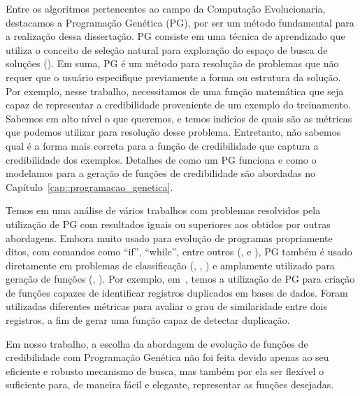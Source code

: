 Entre os algoritmos pertencentes ao campo da Computação Evolucionaria, destacamos a Programação Genética (\textsc{PG}), por ser um método fundamental para a realização dessa dissertação. \textsc{PG} consiste em uma técnica de aprendizado que utiliza o conceito de seleção natural para exploração do espaço de busca de soluções (\cite{Koza92}).
Em suma, \textsc{PG} é um método para resolução de problemas que não requer que o usuário especifique previamente a forma ou estrutura da solução.
Por exemplo, nesse trabalho, necessitamos de uma função matemática que seja capaz de representar a credibilidade proveniente de um exemplo do treinamento.
Sabemos em alto nível o que queremos, e temos indícios de quais são as métricas que podemos utilizar para resolução desse problema. Entretanto, não sabemos qual é a forma mais correta para a função de credibilidade que captura a credibilidade dos exemplos. Detalhes de como um \textsc{PG} funciona e como o modelamos para a geração de funções de credibilidade são abordadas no Capítulo~\ref{cap::programacao_genetica}.

Temos em \cite{Koza10} uma análise de vários trabalhos com problemas resolvidos pela utilização de \textsc{PG} com resultados iguais ou superiores aos obtidos por outras abordagens.
Embora muito usado para evolução de programas propriamente ditos, com comandos como ``if'', ``while'', entre outros (\cite{Spector98}, \cite{Hauptman07} e \cite{Forrest09}),
\textsc{PG} também é usado diretamente em problemas de classificação (\cite{cavaretta99}, \cite{kishore00}, \cite{freitas02}) e amplamente utilizado para geração de funções (\cite{Golubski02}, \cite{Freitas10}).
Por exemplo, em~\cite{Freitas10}, temos a utilização de \textsc{PG} para criação de funções capazes de identificar registros duplicados em bases de dados. Foram utilizadas diferentes métricas para avaliar o grau de similaridade entre dois registros, a fim de gerar uma função capaz de detectar duplicação.

Em nosso trabalho, a escolha da abordagem de evolução de funções de credibilidade com Programação Genética não foi feita devido apenas ao seu eficiente e robusto mecanismo de busca, mas também por ela ser flexível o suficiente para, de maneira fácil e elegante, representar as funções desejadas.



